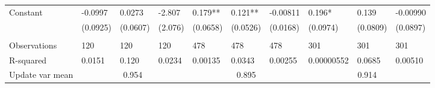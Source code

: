 \begin{tabular}{lccccccccc}
Constant  & \multicolumn{1}{l}{-0.0997} & \multicolumn{1}{l}{0.0273} & \multicolumn{1}{l}{-2.807} & \multicolumn{1}{l}{0.179**} & \multicolumn{1}{l}{0.121**} & \multicolumn{1}{l}{-0.00811} & \multicolumn{1}{l}{0.196*} & \multicolumn{1}{l}{0.139} & \multicolumn{1}{l}{-0.00990} \\
      & \multicolumn{1}{l}{(0.0925)} & \multicolumn{1}{l}{(0.0607)} & \multicolumn{1}{l}{(2.076)} & \multicolumn{1}{l}{(0.0658)} & \multicolumn{1}{l}{(0.0526)} & \multicolumn{1}{l}{(0.0168)} & \multicolumn{1}{l}{(0.0974)} & \multicolumn{1}{l}{(0.0809)} & \multicolumn{1}{l}{(0.0897)} \\
      &       &       &       &       &       &       &       &       &  \\
\midrule
Observations & \multicolumn{1}{l}{120} & \multicolumn{1}{l}{120} & \multicolumn{1}{l}{120} & \multicolumn{1}{l}{478} & \multicolumn{1}{l}{478} & \multicolumn{1}{l}{478} & \multicolumn{1}{l}{301} & \multicolumn{1}{l}{301} & \multicolumn{1}{l}{301} \\
R-squared & \multicolumn{1}{l}{0.0151} & \multicolumn{1}{l}{0.120} & \multicolumn{1}{l}{0.0234} & \multicolumn{1}{l}{0.00135} & \multicolumn{1}{l}{0.0343} & \multicolumn{1}{l}{0.00255} & \multicolumn{1}{l}{0.00000552} & \multicolumn{1}{l}{0.0685} & \multicolumn{1}{l}{0.00510} \\
Update var mean & \multicolumn{3}{c}{0.954} & \multicolumn{3}{c}{0.895} & \multicolumn{3}{c}{0.914} \\
\bottomrule
\bottomrule
\end{tabular}%
